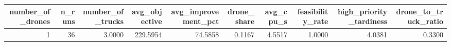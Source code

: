 \begin{tabular}{rrrrrrrrrr}
\toprule
number_of_drones & n_runs & number_of_trucks & avg_objective & avg_improvement_pct & drone_share & avg_cpu_s & feasibility_rate & high_priority_tardiness & drone_to_truck_ratio \\
\midrule
1 & 36 & 3.0000 & 229.5954 & 74.5858 & 0.1167 & 4.5517 & 1.0000 & 4.0381 & 0.3300 \\
\bottomrule
\end{tabular}

